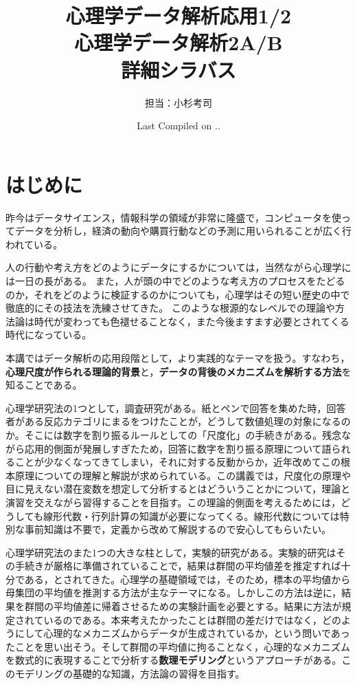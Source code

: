 \documentclass[dvipsnames]{ltjsarticle}
\begin{document}
\title{心理学データ解析応用1/2\\心理学データ解析2A/B\\詳細シラバス}
\author{担当：小杉考司}
\date{Last Compiled on \number\year .\number\month .\number\day}
\maketitle
\setcounter{tocdepth}{1}
\tableofcontents
\newpage
\section*{はじめに}
昨今はデータサイエンス，情報科学の領域が非常に隆盛で，コンピュータを使ってデータを分析し，経済の動向や購買行動などの予測に用いられることが広く行われている。

人の行動や考え方をどのようにデータにするかについては，当然ながら心理学には一日の長がある。
また，人が頭の中でどのような考え方のプロセスをたどるのか，それをどのように検証するのかについても，心理学はその短い歴史の中で徹底的にその技法を洗練させてきた。
このような根源的なレベルでの理論や方法論は時代が変わっても色褪せることなく，また今後ますます必要とされてくる時代になっている。

本講ではデータ解析の応用段階として，より実践的なテーマを扱う。すなわち，\textbf{心理尺度が作られる理論的背景}と，\textbf{データの背後のメカニズムを解析する方法}を知ることである。

心理学研究法の1つとして，調査研究がある。紙とペンで回答を集めた時，回答者がある反応カテゴリにまるをつけたことが，どうして数値処理の対象になるのか。そこには数字を割り振るルールとしての「尺度化」の手続きがある。残念ながら応用的側面が発展しすぎたため，回答に数字を割り振る原理について語られることが少なくなってきてしまい，それに対する反動からか，近年改めてこの根本原理についての理解と解説が求められている。この講義では，尺度化の原理や目に見えない潜在変数を想定して分析するとはどういうことかについて，理論と演習を交えながら習得することを目指す。この理論的側面を考えるためには，どうしても線形代数・行列計算の知識が必要になってくる。線形代数については特別な事前知識は不要で，定義から改めて解説するので安心してもらいたい。

心理学研究法のまた1つの大きな柱として，実験的研究がある。実験的研究はその手続きが厳格に準備されていることで，結果は群間の平均値差を推定すれば十分である，とされてきた。心理学の基礎領域では，そのため，標本の平均値から母集団の平均値を推測する方法が主なテーマになる。しかしこの方法は逆に，結果を群間の平均値差に帰着させるための実験計画を必要とする。結果に方法が規定されているのである。本来考えたかったことは群間の差だけではなく，どのようにして心理的なメカニズムからデータが生成されているか，という問いであったことを思い出そう。そして群間の平均値に拘ることなく，心理的なメカニズムを数式的に表現することで分析する\textbf{数理モデリング}というアプローチがある。このモデリングの基礎的な知識，方法論の習得を目指す。
\end{document}
